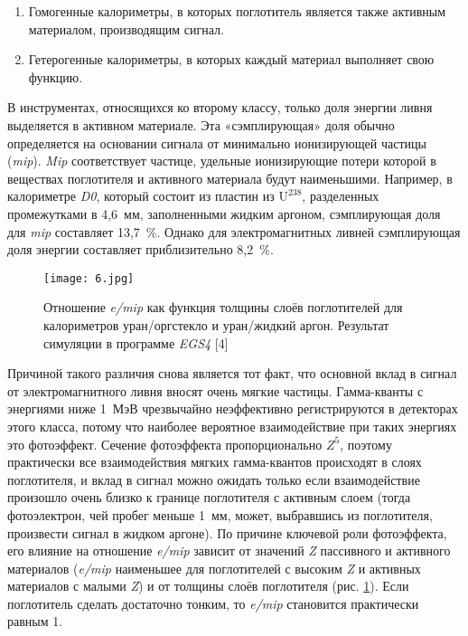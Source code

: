 \begin{enumerate}[wide]
\item Гомогенные калориметры, в которых поглотитель является также активным материалом, производящим сигнал.
\item Гетерогенные калориметры,  в  которых  каждый  материал выполняет свою функцию.
\end{enumerate}

В инструментах, относящихся ко второму классу, только доля энергии ливня выделяется в активном материале. Эта «сэмплирующая» доля обычно определяется на основании сигнала от минимально ионизирующей частицы (\textit{mip}). \textit{Mip} соответствует частице, удельные ионизирующие потери которой в веществах  поглотителя  и  активного  материала  будут  наименьшими. Например,  в  калориметре \textit{D0},  который  состоит  из  пластин  из $\mathrm{U^{238}}$, разделенных  промежутками  в  \mbox{4,6  мм},  заполненными жидким  аргоном, сэмплирующая   доля для \textit{mip} составляет \mbox{13,7   \%}. Однако для электромагнитных   ливней   сэмплирующая   доля   энергии   составляет приблизительно \mbox{8,2 \%}.

\begin{figure}[!h]
    \centering
    \texttt{[image: 6.jpg]}
    \caption{Отношение \textit{e/mip} как функция толщины слоёв поглотителей для калориметров уран/оргстекло и уран/жидкий аргон. Результат симуляции в программе \textit{EGS4} [4]}
    \label{fig:eDevMip}
\end{figure}

Причиной такого различия снова является тот факт, что основной вклад в сигнал от электромагнитного ливня вносят очень мягкие частицы. Гамма-кванты с энергиями ниже \mbox{1 МэВ} чрезвычайно неэффективно регистрируются в  детекторах этого класса, потому  что  наиболее  вероятное  взаимодействие при таких энергиях это фотоэффект. Сечение фотоэффекта пропорционально $Z^5$,  поэтому  практически  все  взаимодействия  мягких  гамма-квантов происходят  в  слоях  поглотителя,  и  вклад  в  сигнал  можно  ожидать  только если  взаимодействие  произошло  очень  близко  к  границе  поглотителя  с активным  слоем  (тогда  фотоэлектрон,  чей  пробег  меньше  \mbox{1  мм}, может, выбравшись  из  поглотителя, произвести  сигнал  в  жидком  аргоне). По причине  ключевой  роли  фотоэффекта,  его  влияние на  отношение \textit{e/mip} зависит от значений \textit{Z} пассивного и активного материалов (\textit{e/mip} наименьшее для  поглотителей  с  высоким \textit{Z} и  активных  материалов  с  малыми \textit{Z})  и  от толщины слоёв поглотителя (рис. \ref{fig:eDevMip}). Если поглотитель сделать достаточно тонким, то \textit{e/mip} становится практически равным 1.

